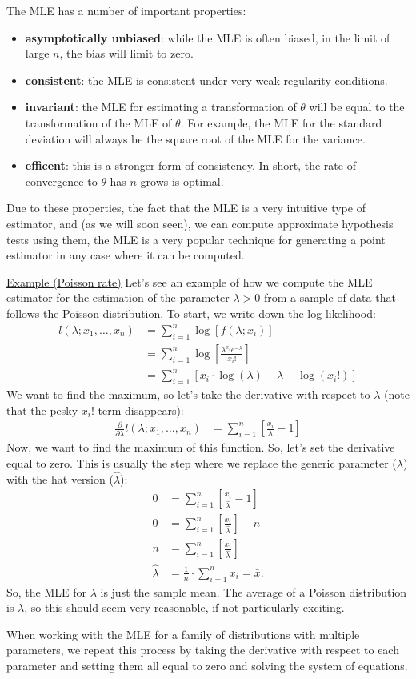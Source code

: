 \documentclass{tufte-handout}
\begin{document}
The MLE has a number of important properties:
\begin{itemize}
\item \textbf{asymptotically unbiased}: while the MLE is often biased, in the
  limit of large $n$, the bias will limit to zero.
\item \textbf{consistent}: the MLE is consistent under very weak regularity
  conditions.
\item \textbf{invariant}: the MLE for estimating a transformation of $\theta$
  will be equal to the transformation of the MLE of $\theta$. For example,
  the MLE for the standard deviation will always be the square root of the
  MLE for the variance.
\item \textbf{efficent}: this is a stronger form of consistency. In short,
  the rate of convergence to $\theta$ has $n$ grows is optimal.
\end{itemize}
Due to these properties, the fact that the MLE is a very intuitive type of
estimator, and (as we will soon seen), we can compute approximate hypothesis
tests using them, the MLE is a very popular technique for generating a
point estimator in any case where it can be computed.

\newpage

\noindent
\underline{Example (Poisson rate)}
Let's see an example of how we compute the MLE estimator for the estimation
of the parameter $\lambda > 0$ from a sample of data that follows the Poisson
distribution. To start, we write down the log-likelihood:
\begin{align*}
l(\lambda; x_1, \ldots, x_n) &= \sum_{i=1}^n \log\left[ f(\lambda; x_i) \right] \\
&= \sum_{i=1}^n \log\left[ \frac{\lambda^{x_i} e^{-\lambda}}{x_i!} \right] \\
&= \sum_{i=1}^n \left[ x_i \cdot \log(\lambda) - \lambda - \log(x_i!) \right]
\end{align*}
We want to find the maximum, so let's take the derivative with respect to
$\lambda$ (note that the pesky $x_i!$ term disappears):
\begin{align*}
\frac{\partial}{\partial \lambda} l(\lambda; x_1, \ldots, x_n)
&= \sum_{i=1}^n \left[ \frac{x_i}{\lambda} - 1 \right] 
\end{align*}
Now, we want to find the maximum of this function. So, let's set the derivative
equal to zero. This is usually the step where we replace the generic parameter
($\lambda$) with the hat version ($\hat{\lambda}$):
\begin{align*}
0 &= \sum_{i=1}^n \left[ \frac{x_i}{\hat{\lambda}} - 1 \right] \\
0 &= \sum_{i=1}^n \left[ \frac{x_i}{\hat{\lambda}} \right] - n \\
n &= \sum_{i=1}^n \left[ \frac{x_i}{\hat{\lambda}} \right] \\
\hat{\lambda} &= \frac{1}{n} \cdot \sum_{i=1}^n x_i = \bar{x}.
\end{align*}
So, the MLE for $\lambda$ is just the sample mean. The average of 
a Poisson distribution is $\lambda$, so this should seem very 
reasonable, if not particularly exciting.

When working with the MLE for a family of distributions with multiple
parameters, we repeat this process by taking the derivative with 
respect to each parameter and setting them all equal to zero and 
solving the system of equations. 
\end{document}
